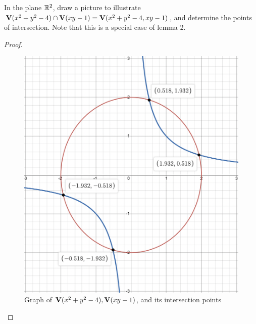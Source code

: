 \begin{exercise}{3}
In the plane $\mathbb{R}^2$, draw a picture to illustrate $\mathbf{V}(x^2+y^2-4) \cap \mathbf{V}(xy-1) = \mathbf{V}(x^2+y^2-4,xy-1)$, and determine the points of intersection. Note that this is a special case of lemma 2.
\end{exercise}
\begin{proof}
 \begin{figure}[H]
     \centering
     \includegraphics[width=.5\textwidth]{cox-little-oshea/ch1/assets/sec1-2-ex3.png}
     \caption{Graph of $\mathbf{V}(x^2+y^2-4), \mathbf{V}(xy-1)$, and its intersection points}
     \label{fig:sec1-2-ex3}
 \end{figure}
\end{proof}

